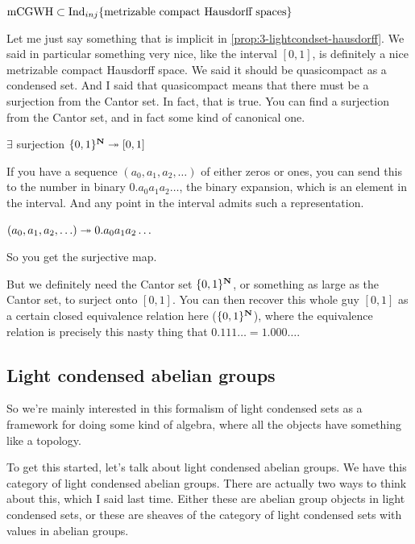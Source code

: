 $\mathrm{mCGWH} \subset \mathrm{Ind}_{inj} \{ \text{metrizable compact Hausdorff spaces} \}$



Let me just say something that is implicit in \ref{prop:3-lightcondset-hausdorff}. We said in particular something very nice, like the interval $[0,1]$, is definitely a nice metrizable compact Hausdorff space. We said it should be quasicompact as a condensed set. And I said that quasicompact means that there must be a surjection from the Cantor set. In fact, that is true. You can find a surjection from the Cantor set, and in fact some kind of canonical one.

$ \exists$ surjection
$\{ 0,1 \}^{\mathbf N} \twoheadrightarrow [0,1]$

If you have a sequence $(a_0, a_1, a_2, \ldots)$ of either zeros or ones, you can send this to the number in binary $0.a_0 a_1 a_2 \ldots$, the binary expansion, which is an element in the interval. And any point in the interval admits such a representation.

$(a_0, a_1, a_2, \ldots) \twoheadrightarrow 0.a_0 a_1 a_2 \ldots$

So you get the surjective map.

But we definitely need the Cantor set $\{ 0,1 \}^{\mathbf N}$, or something as large as the Cantor set, to surject onto $[0,1]$. You can then recover this whole guy $[0,1]$ as a certain closed equivalence relation here ($\{ 0,1 \}^{\mathbf N}$), where the equivalence relation is precisely this nasty thing that $0.111\ldots = 1.000\ldots$.

\subsection{Light condensed abelian groups}

So we're mainly interested in this formalism of light condensed sets as a framework for doing some kind of algebra, where all the objects have something like a topology.

To get this started, let's talk about light condensed abelian groups. We have this category of light condensed abelian groups. There are actually two ways to think about this, which I said last time. Either these are abelian group objects in light condensed sets, or these are sheaves of the category of light condensed sets with values in abelian groups. 

